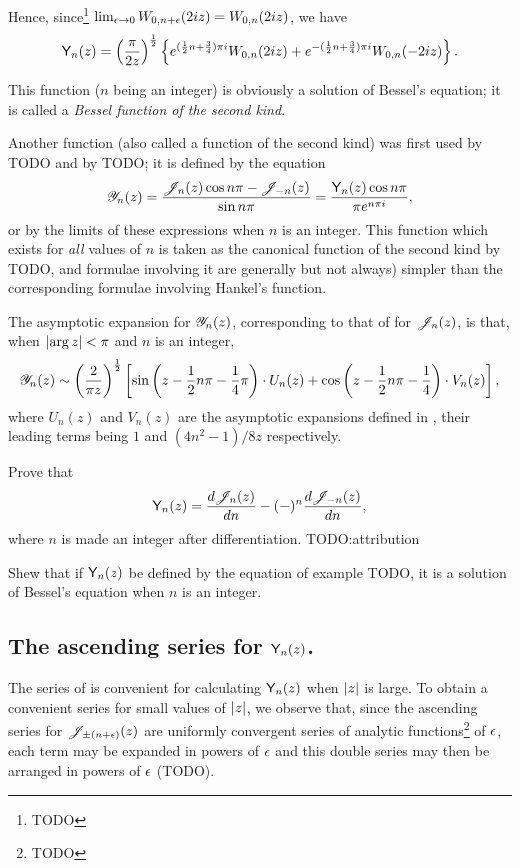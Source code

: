 \documentclass{book}
\begin{document}
    Hence, since\footnote{TODO}
    $\lim_{\epsilon\rightarrow 0} W_{0,n+\epsilon}(2iz) = W_{0,n}(2iz)$, we
    have
    $$
    \mathsf{Y}_n(z)
    =
    \left(  \frac{\pi}{2z}  \right)^{\frac{1}{2}}
    \left\{ 
      e^{(\frac{1}{2} n + \frac{3}{4}) \pi i} W_{0,n}(2iz)
      +
      e^{-(\frac{1}{2} n + \frac{3}{4})\pi i} W_{0,n}(-2iz)
     \right\}.
    $$

    This function ($n$ being an integer) is obviously a solution of
    Bessel's equation; it is called a \emph{Bessel function of the
      second kind}.

    Another function (also called a function of the second kind) was
    first used by TODO and by TODO; it is defined by the equation
    $$
    \mathscr{Y}_n(z) = \frac{\mathscr{J}_n(z) \cos n\pi - \mathscr{J}_{-n}(z)}{\sin n\pi}
    = \frac{\mathsf{Y}_n(z) \cos n\pi}{\pi e^{n\pi i}},
    $$
    or by the limits of these expressions when $n$ is an integer. This
    function which exists for \emph{all} values of $n$ is taken as the
    canonical function of the second kind by TODO, and formulae
    involving it are generally but not always) simpler than the
    corresponding formulae involving Hankel's function.

    The asymptotic expansion for $\mathscr{Y}_n(z)$, corresponding to that of
     for $\mathscr{J}_n(z)$, is that, when
    $\left| \arg z \right| < \pi$ and $n$ is an integer,
    $$
    \mathscr{Y}_n(z)
    \sim
    \left(  \frac{2}{\pi z}  \right)^{\frac{1}{2}}
    \left[  \sin\left( z - \frac{1}{2} n \pi - \frac{1}{4} \pi \right)
      \cdot U_n(z)
      + \cos\left( z - \frac{1}{2} n \pi - \frac{1}{4} \right) \cdot V_n(z)
     \right],
    $$
    where $U_n(z)$ and $V_n(z)$ are the asymptotic expansions defined
    in , their leading terms being $1$ and
    $(4n^2-1)/8z$ respectively.
    \begin{wandwexample}
      Prove that
      $$
      \mathsf{Y}_n(z)
      =
      \frac{d\mathscr{J}_n(z)}{dn}
      -
      (-)^n \frac{d\mathscr{J}_{-n}(z)}{dn},
      $$
      where $n$ is made an integer after differentiation.
      TODO:attribution
    \end{wandwexample}
    \begin{wandwexample}
      Shew that if $\mathsf{Y}_n(z)$ be defined by the equation of example
      TODO, it is a solution of Bessel's equation when $n$ is an integer.
    \end{wandwexample}
    \subsection{The ascending series for $\mathsf{Y}_n(z)$.}
    The series of  is convenient for calculating
    $\mathsf{Y}_n(z)$ when $\left| z \right|$ is large. To obtain a convenient
    series for small values of $\left| z \right|$, we observe that, since
    the ascending series for $\mathscr{J}_{\pm (n+\epsilon)}(z)$ are uniformly
    convergent series of analytic functions\footnote{TODO} of $\epsilon$,
    each term may be expanded in powers of $\epsilon$ and this double
    series may then be arranged in powers of
    $\epsilon$ (TODO).
\end{document}
